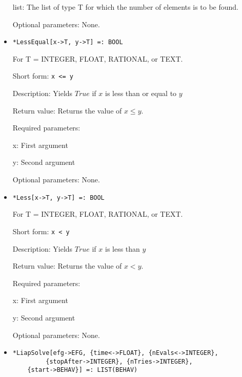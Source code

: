 \begin{itemize}
\bd
\item
[list:] The list of type T for which the number of elements is to be
found.
\ed

\item
[Optional parameters:] None.
\ed

\item
\protect \large \begin{verbatim}
*LessEqual[x->T, y->T] =: BOOL
\end{verbatim}\normalsize

For T = INTEGER, FLOAT, RATIONAL, or TEXT.

\bd
\item
[Short form:] \verb+x <= y+
\item
[Description:] Yields $True$ if $x$ is less than or equal to $y$
\item
[Return value:] Returns the value of $x \leq y$.
\item
[Required parameters:]\hfil\null

\bd
\item
[x:] First argument
\item
[y:] Second argument
\ed

\item
[Optional parameters:] None.
\ed

\item
\protect \large \begin{verbatim}
*Less[x->T, y->T] =: BOOL
\end{verbatim}\normalsize

For T = INTEGER, FLOAT, RATIONAL, or TEXT.

\bd
\item
[Short form:] \verb+x < y+
\item
[Description:] Yields $True$ if $x$ is less than $y$
\item
[Return value:] Returns the value of $x < y$.
\item
[Required parameters:]\hfil\null

\bd
\item
[x:] First argument
\item
[y:] Second argument
\ed
\item
[Optional parameters:] None.
\ed

\item
\protect \large \begin{verbatim}
*LiapSolve[efg->EFG, {time<->FLOAT}, {nEvals<->INTEGER},
         {stopAfter->INTEGER}, {nTries->INTEGER}, 
	{start->BEHAV}] =: LIST(BEHAV)
\end{verbatim}\normalsize


\end{itemize}
